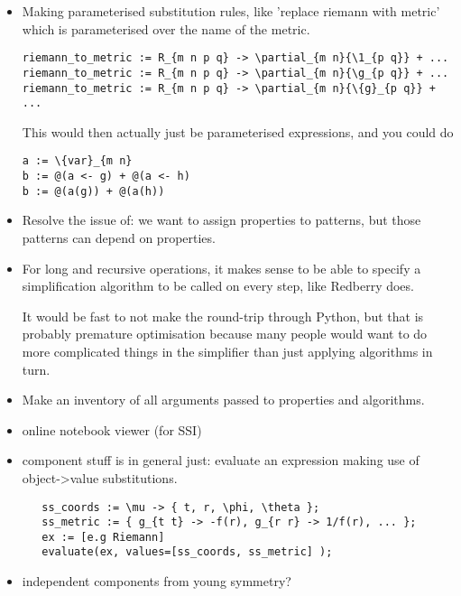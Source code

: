 \documentclass[11pt]{article}
\begin{document}
\begin{itemize}
\item Making parameterised substitution rules, like 'replace riemann with metric' 
which is parameterised over the name of the metric.
\begin{lstlisting}
riemann_to_metric := R_{m n p q} -> \partial_{m n}{\1_{p q}} + ...
riemann_to_metric := R_{m n p q} -> \partial_{m n}{\g_{p q}} + ...
riemann_to_metric := R_{m n p q} -> \partial_{m n}{\{g}_{p q}} + ...
\end{lstlisting}
This would then actually just be parameterised expressions, and you could do
\begin{lstlisting}
a := \{var}_{m n}
b := @(a <- g) + @(a <- h)
b := @(a(g)) + @(a(h))
\end{lstlisting}

\item Resolve the issue of: we want to assign properties to patterns, but those patterns can 
depend on properties.

\item For long and recursive operations, it makes sense to be able to specify a simplification
algorithm to be called on every step, like Redberry does.

%      
% 
  
It would be fast to not make the round-trip through Python, but that
is probably premature optimisation because many people would want to
do more complicated things in the simplifier than just applying
algorithms in turn.

\item Make an inventory of all arguments passed to properties and algorithms.

\item online notebook viewer (for SSI)

\item component stuff is in general just: evaluate an expression
  making use of object->value substitutions. 

\begin{verbatim}
   ss_coords := \mu -> { t, r, \phi, \theta };
   ss_metric := { g_{t t} -> -f(r), g_{r r} -> 1/f(r), ... };
   ex := [e.g Riemann]
   evaluate(ex, values=[ss_coords, ss_metric] );
\end{verbatim}

\item independent components from young symmetry?

\end{itemize}
\end{document}
